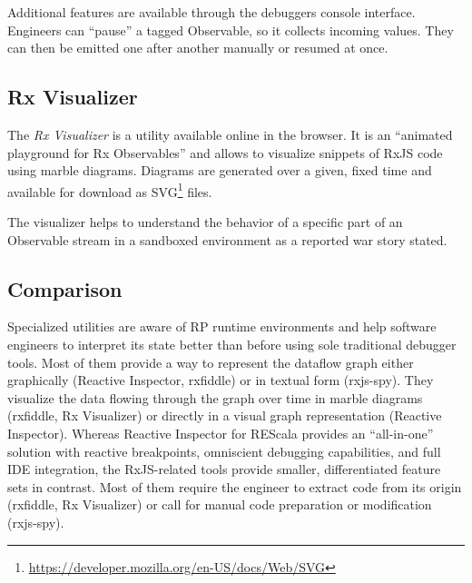 \documentclass[12pt,a4paper]{article}
\begin{document}
Additional features are available through the debuggers console interface. Engineers can ``pause'' a tagged Observable, so it collects incoming values. They can then be emitted one after another manually or resumed at once.

\subsection{Rx Visualizer}

The \emph{Rx Visualizer}\cite{rxviz} is a utility available online in the browser. It is an ``animated playground for Rx Observables''\cite{rxviz} and allows to visualize snippets of RxJS code using marble diagrams. Diagrams are generated over a given, fixed time and available for download as SVG\footnote{\url{https://developer.mozilla.org/en-US/docs/Web/SVG}} files.

The visualizer helps to understand the behavior of a specific part of an Observable stream in a sandboxed environment as a reported war story stated.

\subsection{Comparison}

Specialized utilities are aware of RP runtime environments and help software engineers to interpret its state better than before using sole traditional debugger tools. Most of them provide a way to represent the dataflow graph either graphically (Reactive Inspector, rxfiddle) or in textual form (rxjs-spy). They visualize the data flowing through the graph over time in marble diagrams (rxfiddle, Rx Visualizer) or directly in a visual graph representation (Reactive Inspector). Whereas Reactive Inspector for REScala provides an ``all-in-one'' solution with reactive breakpoints, omniscient debugging capabilities, and full IDE integration, the RxJS-related tools provide smaller, differentiated feature sets in contrast. Most of them require the engineer to extract code from its origin (rxfiddle, Rx Visualizer) or call for manual code preparation or modification (rxjs-spy).
\end{document}
